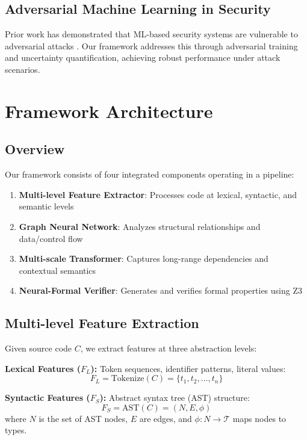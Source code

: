 \documentclass[10pt,journal,compsoc]{IEEEtran}
\begin{document}
\subsection{Adversarial Machine Learning in Security}
Prior work has demonstrated that ML-based security systems are vulnerable to adversarial attacks \cite{carlini2017adversarial}. Our framework addresses this through adversarial training and uncertainty quantification, achieving robust performance under attack scenarios.

\section{Framework Architecture}

\subsection{Overview}
Our framework consists of four integrated components operating in a pipeline:

\begin{enumerate}
\item \textbf{Multi-level Feature Extractor}: Processes code at lexical, syntactic, and semantic levels
\item \textbf{Graph Neural Network}: Analyzes structural relationships and data/control flow
\item \textbf{Multi-scale Transformer}: Captures long-range dependencies and contextual semantics
\item \textbf{Neural-Formal Verifier}: Generates and verifies formal properties using Z3
\end{enumerate}

\subsection{Multi-level Feature Extraction}
Given source code $C$, we extract features at three abstraction levels:

\textbf{Lexical Features ($F_L$):} Token sequences, identifier patterns, literal values:
\begin{equation}
F_L = \text{Tokenize}(C) = \{t_1, t_2, \ldots, t_n\}
\end{equation}

\textbf{Syntactic Features ($F_S$):} Abstract syntax tree (AST) structure:
\begin{equation}
F_S = \text{AST}(C) = (N, E, \phi)
\end{equation}
where $N$ is the set of AST nodes, $E$ are edges, and $\phi: N \to \mathcal{T}$ maps nodes to types.
\end{document}
